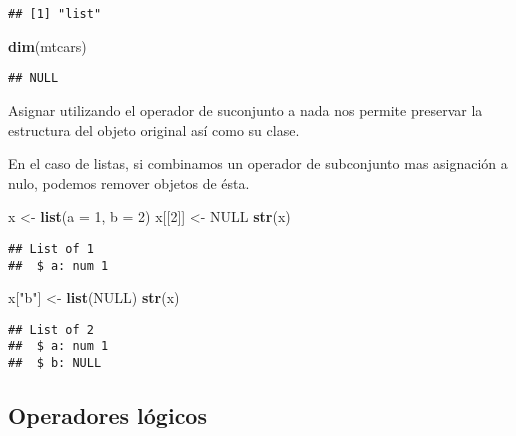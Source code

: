 \documentclass[]{article}
\newenvironment{Shaded}{\begin{snugshade}}{\end{snugshade}}
\newcommand{\KeywordTok}[1]{\textcolor[rgb]{0.13,0.29,0.53}{\textbf{{#1}}}}
\newcommand{\DataTypeTok}[1]{\textcolor[rgb]{0.13,0.29,0.53}{{#1}}}
\newcommand{\DecValTok}[1]{\textcolor[rgb]{0.00,0.00,0.81}{{#1}}}
\newcommand{\StringTok}[1]{\textcolor[rgb]{0.31,0.60,0.02}{{#1}}}
\newcommand{\OtherTok}[1]{\textcolor[rgb]{0.56,0.35,0.01}{{#1}}}
\newcommand{\NormalTok}[1]{{#1}}
\begin{document}
\begin{verbatim}
## [1] "list"
\end{verbatim}

\begin{Shaded}
\begin{Highlighting}[]
\KeywordTok{dim}\NormalTok{(mtcars)}
\end{Highlighting}
\end{Shaded}

\begin{verbatim}
## NULL
\end{verbatim}

Asignar utilizando el operador de suconjunto a nada nos permite
preservar la estructura del objeto original así como su clase.

En el caso de listas, si combinamos un operador de subconjunto mas
asignación a nulo, podemos remover objetos de ésta.

\begin{Shaded}
\begin{Highlighting}[]
\NormalTok{x <-}\StringTok{ }\KeywordTok{list}\NormalTok{(}\DataTypeTok{a =} \DecValTok{1}\NormalTok{, }\DataTypeTok{b =} \DecValTok{2}\NormalTok{)}
\NormalTok{x[[}\DecValTok{2}\NormalTok{]] <-}\StringTok{ }\OtherTok{NULL}
\KeywordTok{str}\NormalTok{(x)}
\end{Highlighting}
\end{Shaded}

\begin{verbatim}
## List of 1
##  $ a: num 1
\end{verbatim}

\begin{Shaded}
\begin{Highlighting}[]
\NormalTok{x[}\StringTok{"b"}\NormalTok{] <-}\StringTok{ }\KeywordTok{list}\NormalTok{(}\OtherTok{NULL}\NormalTok{)}
\KeywordTok{str}\NormalTok{(x)}
\end{Highlighting}
\end{Shaded}

\begin{verbatim}
## List of 2
##  $ a: num 1
##  $ b: NULL
\end{verbatim}

\subsection{Operadores lógicos}\label{operadores-logicos}
\end{document}
